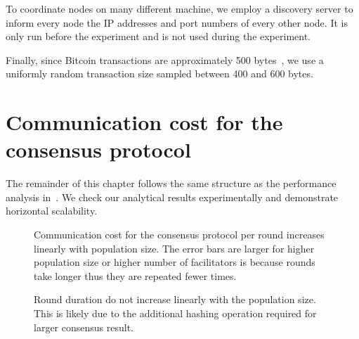 To coordinate nodes on many different machine,
we employ a discovery server to inform every node the IP addresses and port numbers of every other node.
It is only run before the experiment and is not used during the experiment.

Finally, since Bitcoin transactions are approximately 500 bytes~\cite{txsize},
we use a uniformly random transaction size sampled between 400 and 600 bytes.


\section{Communication cost for the consensus protocol}
\label{sec:comms-cost-experiment}

The remainder of this chapter follows the same structure as the performance analysis in~.
We check our analytical results experimentally and demonstrate horizontal scalability.

\begin{figure}[tb]
  \centering
  \caption{Communication cost for the consensus protocol per round increases linearly with population size.
  The error bars are larger for higher population size or higher number of facilitators is because rounds take longer thus they are repeated fewer times.}
  \label{fig:round-comms}
\end{figure}

\begin{figure}[tb]
  \centering
  \caption{Round duration do not increase linearly with the population size. 
  This is likely due to the additional hashing operation required for larger consensus result.}
  \label{fig:round-duration}
\end{figure}

